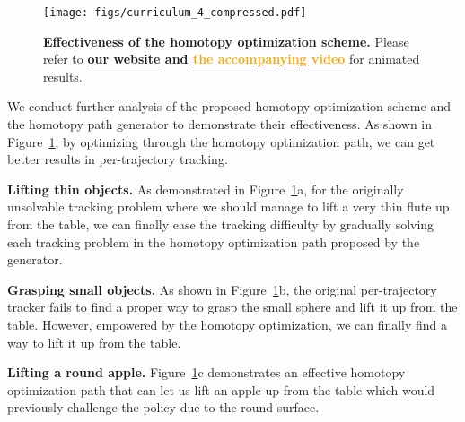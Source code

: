 \begin{figure}[h]
  \centering
  \texttt{[image: figs/curriculum\_4\_compressed.pdf]}
  \caption{
  \textbf{Effectiveness of the homotopy optimization scheme. }
  Please refer to \textbf{\href{https://projectwebsite7.github.io/gene-dex-manip/}{our website} and {\href{https://projectwebsite7.github.io/gene-dex-manip/static/videos-lowres/video_7.mp4}{\textcolor{orange}{the accompanying video}}}} for animated results.
  }
  \label{fig_curriculum}
\end{figure}

We conduct further analysis of the proposed homotopy optimization scheme and the homotopy path generator to demonstrate their effectiveness. As shown in Figure~\ref{fig_curriculum}, by optimizing through the homotopy optimization path, we can get better results in per-trajectory tracking. 



\noindent\textbf{Lifting thin objects. } 
As demonstrated in Figure~\ref{fig_curriculum}a, for the originally unsolvable tracking problem where we should manage to lift a very thin flute up from the table, we can finally ease the tracking difficulty by gradually solving each tracking problem in the homotopy optimization path proposed by the generator. 

\noindent\textbf{Grasping small objects. }
As shown in Figure~\ref{fig_curriculum}b, the original per-trajectory tracker fails to find a proper way to grasp the small sphere and lift it up from the table. However, empowered by the homotopy optimization, we can finally find a way to lift it up from the table. 


\noindent\textbf{Lifting a round apple.} Figure~\ref{fig_curriculum}c demonstrates an effective homotopy optimization path that can let us lift an apple up from the table which would previously challenge the policy due to the round surface. 



